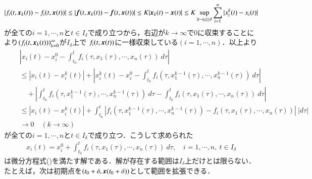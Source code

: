\begin{prf}
\begin{description}
			\begin{align}
				|f_i(t,\mbox{\boldmath $x$}_k(t)) - f_i(t,\mbox{\boldmath $x$}(t))| \leq |\mbox{\boldmath $f$}(t,\mbox{\boldmath $x$}_k(t)) - \mbox{\boldmath $f$}(t,\mbox{\boldmath $x$}(t))|
				\leq K|\mbox{\boldmath $x$}_k(t) - \mbox{\boldmath $x$}(t)| \leq K \operatorname*{sup}_{|t - t_0|\leq \delta} \sum_{i=1}^{n}|x_i^{k}(t) - x_i(t)|
			\end{align}
			が全ての$i=1,\cdots,n$と$t \in I_\delta$で成り立つから，右辺が$k \longrightarrow \infty$で$0$に収束することにより$(f_i(t,\mbox{\boldmath $x$}_k(t)))_{k=0}^{\infty}$が$I_\delta$上で
			$f_i(t,\mbox{\boldmath $x$}(t))$に一様収束している$(i=1,\cdots,n)$．以上より
			\begin{align}
				&\left| x_i(t) - x_i^0 - \int_{t_0}^t f_i(\tau,x_1(\tau), \cdots, x_n(\tau))\ d\tau \right| \\
				\quad&\leq |x_i(t) - x_i^k(t)| + \left|x_i^k(t) - x_i^0 - \int_{t_0}^t f_i(\tau,x_1^{k-1}(\tau), \cdots, x_n^{k-1}(\tau))\ d\tau \right| \\
					&\quad+ \left| \int_{t_0}^t f_i(\tau,x_1^{k-1}(\tau), \cdots, x_n^{k-1}(\tau))\ d\tau - \int_{t_0}^t f_i(\tau,x_1(\tau), \cdots, x_n(\tau))\ d\tau \right| \\
				\quad&\leq |x_i(t) - x_i^k(t)| + \int_{t_0}^t |f_i(\tau,x_1^{k-1}(\tau), \cdots, x_n^{k-1}(\tau)) - f_i(\tau,x_1(\tau), \cdots, x_n(\tau))|\ |d\tau| \\
				&\longrightarrow 0 \quad (k \longrightarrow \infty)
			\end{align}
			が全ての$i=1,\cdots,n$と$t \in I_\delta$で成り立つ．こうして求められた
			\begin{align}
				x_i(t) = x_i^0 + \int_{t_0}^t f_i(\tau,x_1(\tau), \cdots, x_n(\tau))\ d\tau, \quad i=1,\cdots,n,\ t \in I_\delta
			\end{align}
			は微分方程式()を満たす解である．解が存在する範囲は$I_\delta$上だけとは限らない．たとえば，次は初期点を$(t_0+\delta, \mbox{\boldmath $x$}(t_0+\delta))$として範囲を拡張できる．
		

\end{description}
\end{prf}
